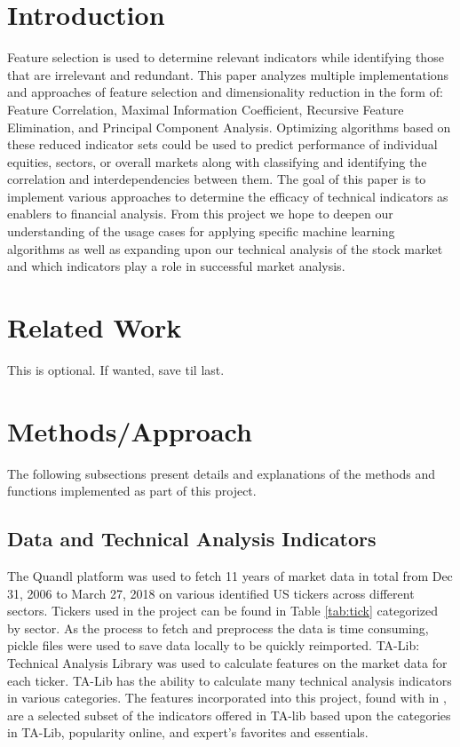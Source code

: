 \documentclass{article}\raggedbottom
\begin{document}
\section{\color{red}Introduction}
	Feature selection is used to determine relevant indicators while identifying those that are irrelevant and redundant. This paper analyzes multiple implementations and approaches of feature selection and dimensionality reduction in the form of: Feature Correlation, Maximal Information Coefficient, Recursive Feature Elimination, and Principal Component Analysis. Optimizing algorithms based on these reduced indicator sets could be used to predict performance of individual equities, sectors, or overall markets along with classifying and identifying the correlation and interdependencies between them. The goal of this paper is to implement various approaches to determine the efficacy of technical indicators as enablers to financial analysis.	From this project we hope to deepen our understanding of the usage cases for applying specific machine learning algorithms as well as expanding upon our technical analysis of the stock market and which indicators play a role in successful market analysis.

\section{Related Work}
This is optional. If wanted, save til last.

\section{Methods/Approach}
The following subsections present details and explanations of the methods and functions implemented as part of this project.

\subsection{Data and Technical Analysis Indicators}
The Quandl platform was used to fetch 11 years of market data in total from Dec 31, 2006 to March 27, 2018 on various identified US tickers across different sectors. Tickers used in the project can be found in Table \ref{tab:tick} categorized by sector. As the process to fetch and preprocess the data is time consuming, pickle files were used to save data locally to be quickly reimported. TA-Lib: Technical Analysis Library was used to calculate features on the market data for each ticker. TA-Lib has the ability to calculate many technical analysis indicators in various categories. The features incorporated into this project, found with in , are a selected subset of the indicators offered in TA-lib based upon the categories in TA-Lib, popularity online, and expert's favorites and essentials.
\end{document}
